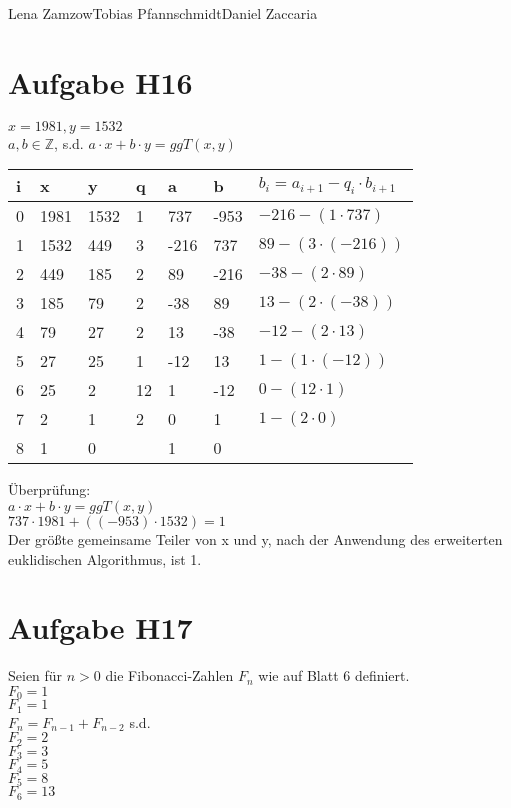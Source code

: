 \documentclass[11pt,a4paper]{article}
\begin{document}
                {Lena Zamzow}{Tobias Pfannschmidt}{Daniel Zaccaria}{}{}


\section*{Aufgabe H16}
$x=1981, y=1532$\\
$a,b \in \mathbb{Z}$, s.d. $a\cdot x + b\cdot y = ggT(x,y)$\\
\begin{center}
	\begin{tabular}{ | l | l | l | l | l | l | l|}
		\hline
		i&x&y&q&a&b&$b_i=a_{i+1}-q_i \cdot b_{i+1} $ \\ \hline		
		0&1981&1532&1&737&-953&$-216-(1 \cdot 737 )$ \\ \hline
		1&1532&449&3&-216&737&$89-(3 \cdot (-216) )$ \\ \hline
		2&449&185&2&89&-216&$-38-(2 \cdot 89)$\\ \hline
		3&185&79&2&-38&89&$13-(2 \cdot (-38))$ \\ \hline
		4&79&27&2&13&-38&$-12-(2 \cdot 13)$ \\ \hline
		5&27&25&1&-12&13&$1-(1\cdot (-12))$ \\ \hline
		6&25&2&12&1&-12&$0-(12 \cdot 1)$\\ \hline
		7&2&1&2&0&1&$1-(2 \cdot 0)$\\ \hline
		8&1&0&&1&0&\\ \hline	
	\end{tabular}
\end{center}
Überprüfung:\\
$a\cdot x + b\cdot y = ggT(x,y)$\\
$737\cdot 1981+((-953)\cdot 1532)=1$\\
Der größte gemeinsame Teiler von x und y, nach der Anwendung des erweiterten euklidischen Algorithmus, ist 1.\\

\section*{Aufgabe H17}
Seien für $n>0$ die Fibonacci-Zahlen $F_n$ wie auf Blatt 6 definiert.\\

$F_0 = 1$\\
$F_1 = 1$\\
$F_n=F_{n-1}+F_{n-2}$ s.d.\\
$F_2 = 2$\\
$F_3 = 3$\\
$F_4 = 5$\\
$F_5 = 8$\\
$F_6 = 13$\\
\end{document}
